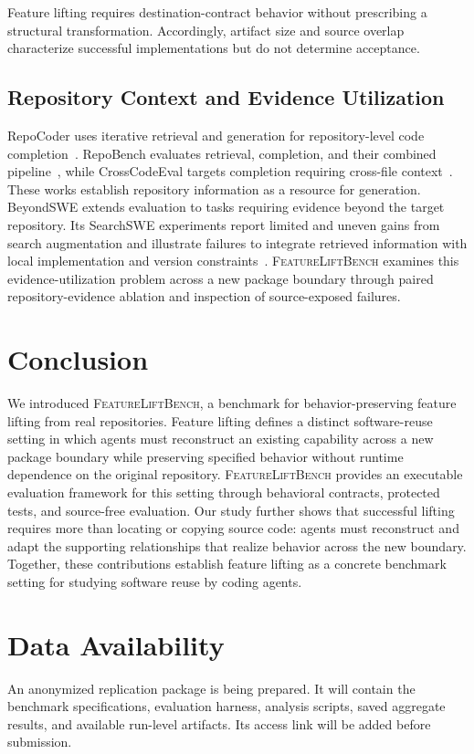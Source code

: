 \documentclass[acmsmall,screen,review,anonymous]{acmart}
\newcommand{\flb}{\textsc{FeatureLiftBench}\xspace}
\begin{document}
Feature lifting requires destination-contract behavior without prescribing a
structural transformation. Accordingly, artifact size and source overlap
characterize successful implementations but do not determine acceptance.

\subsection{Repository Context and Evidence Utilization}

RepoCoder uses iterative retrieval and generation for repository-level code
completion~\cite{zhang2023repocoder}. RepoBench evaluates retrieval, completion,
and their combined pipeline~\cite{liu2024repobench}, while CrossCodeEval targets
completion requiring cross-file context~\cite{ding2023crosscodeeval}. These works
establish repository information as a resource for generation.
BeyondSWE extends evaluation to tasks requiring evidence beyond the target
repository. Its SearchSWE experiments report limited and uneven gains from search
augmentation and illustrate failures to integrate retrieved information with
local implementation and version constraints~\cite{chen2026beyondswe}.
\flb examines this evidence-utilization problem across a new package boundary
through paired repository-evidence ablation and inspection of
source-exposed failures.

\section{Conclusion}

We introduced \flb, a benchmark for behavior-preserving feature lifting from
real repositories. Feature lifting defines a distinct software-reuse setting in
which agents must reconstruct an existing capability across a new package
boundary while preserving specified behavior without runtime dependence on the
original repository. \flb provides an executable evaluation framework for this
setting through behavioral contracts, protected tests, and source-free
evaluation. Our study further shows that successful lifting requires more than
locating or copying source code: agents must reconstruct and adapt the supporting
relationships that realize behavior across the new boundary. Together, these
contributions establish feature lifting as a concrete benchmark setting for
studying software reuse by coding agents.

\section*{Data Availability}
An anonymized replication package is being prepared. It will contain the
benchmark specifications, evaluation harness, analysis scripts, saved aggregate
results, and available run-level artifacts. Its access link will be added
before submission.

\FloatBarrier


\end{document}
